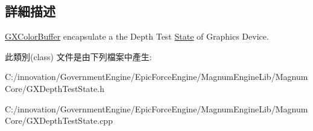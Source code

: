 \subsection{詳細描述}
\hyperlink{class_i_dream_sky_1_1_g_x_color_buffer}{G\+X\+Color\+Buffer} encapsulate a the Depth Test \hyperlink{class_i_dream_sky_1_1_state}{State} of Graphics Device. 

此類別(class) 文件是由下列檔案中產生\+:\begin{DoxyCompactItemize}
\item 
C\+:/innovation/\+Government\+Engine/\+Epic\+Force\+Engine/\+Magnum\+Engine\+Lib/\+Magnum\+Core/G\+X\+Depth\+Test\+State.\+h\item 
C\+:/innovation/\+Government\+Engine/\+Epic\+Force\+Engine/\+Magnum\+Engine\+Lib/\+Magnum\+Core/G\+X\+Depth\+Test\+State.\+cpp\end{DoxyCompactItemize}
